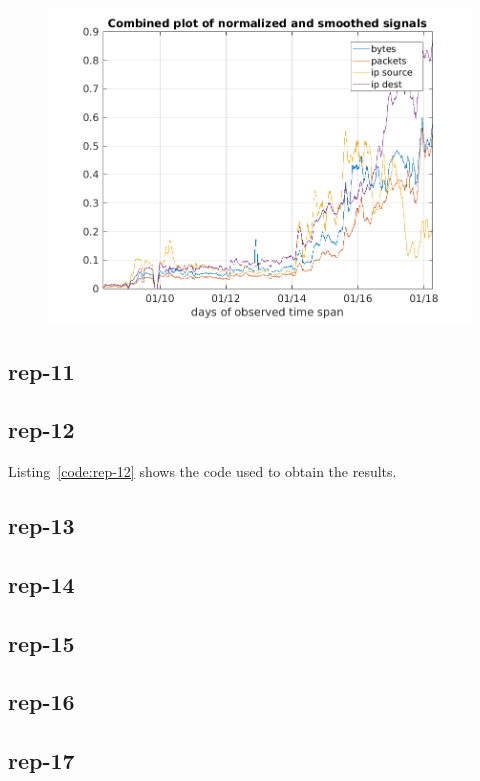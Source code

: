 \documentclass{article}
\begin{document}
\begin{figure}[h]
    \centering
    \includegraphics[scale=.8]{../exercise-3/plots/rep_10_optional}
\end{figure}

\subsection{rep-11}



\subsection{rep-12}

Listing~\ref{code:rep-12} shows the code used to obtain the results.


\subsection{rep-13}
\subsection{rep-14}
\subsection{rep-15}
\subsection{rep-16}
\subsection{rep-17}
\end{document}
